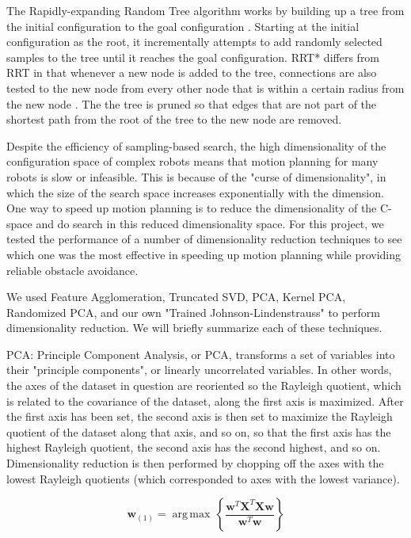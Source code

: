 \documentclass[12pt]{article}
\begin{document}
The Rapidly-expanding Random Tree algorithm works by building up a tree from the initial configuration to the goal configuration \cite{lavalle1998rrt}. Starting at the initial configuration as the root, it incrementally attempts to add randomly selected samples to the tree until it reaches the goal configuration. RRT* differs from RRT in that whenever a new node is added to the tree, connections are also tested to the new node from every other node that is within a certain radius from the new node \cite{karaman2011sampling}. The the tree is pruned so that edges that are not part of the shortest path from the root of the tree to the new node are removed. 

Despite the efficiency of sampling-based search, the high dimensionality of the
configuration space of complex robots means that motion planning for many
robots is slow or infeasible. This is because of the "curse of dimensionality",
in which the size of the search space increases exponentially with the
dimension. One way to speed up motion planning is to reduce the dimensionality
of the C-space and do search in this reduced dimensionality space. For this
project, we tested the performance of a number of dimensionality reduction
techniques to see which one was the most effective in speeding up motion
planning while providing reliable obstacle avoidance.

We used Feature Agglomeration, Truncated SVD, PCA, Kernel PCA, Randomized PCA, and
our own "Trained Johnson-Lindenstrauss" to perform dimensionality reduction. We will briefly summarize each of these techniques.

PCA: Principle Component Analysis, or PCA, transforms a set of variables into 
their "principle components", or linearly uncorrelated variables. In other words, the axes of the dataset in question are reoriented so the Rayleigh quotient, which is related to the covariance of the dataset, along the first axis is maximized. After the first axis has been set, the second axis is then set to maximize the Rayleigh quotient of the dataset along that axis, and so on, so that the first axis has the highest Rayleigh quotient, the second axis has the second highest, and so on. Dimensionality reduction is then performed by chopping off the axes with the lowest Rayleigh quotients (which corresponded to axes with the lowest variance).

$$
\mathbf{w}_{(1)} = {\operatorname{\arg\,max}}\, \left\{ \frac{\mathbf{w}^T\mathbf{X}^T \mathbf{X w}}{\mathbf{w}^T \mathbf{w}} \right\}
$$
\end{document}
